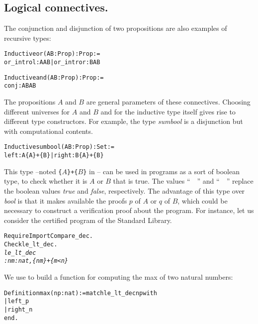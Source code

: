 \documentclass[11pt]{article}
\begin{document}
\subsection{Logical connectives.} \label{LogicalConnectives}
The conjunction and disjunction of two propositions are also examples
of recursive types:

\begin{alltt}
Inductive or (A B : Prop) : Prop :=
    or_introl : A \arrow{} A {\coqor} B | or_intror : B \arrow{} A {\coqor} B

Inductive and (A B : Prop) : Prop :=  
    conj : A \arrow{} B \arrow{} A {\coqand} B

\end{alltt}

The propositions $A$ and $B$ are general parameters of these
connectives. Choosing different universes for 
$A$ and $B$ and for the inductive type itself gives rise to different
type constructors. For example, the type \textsl{sumbool} is a
disjunction but with computational contents.

\begin{alltt}
Inductive sumbool (A B : Prop) : Set :=
    left : A \arrow{} \{A\} + \{B\} | right : B \arrow{} \{A\} + \{B\}
\end{alltt}



This type --noted \texttt{\{$A$\}+\{$B$\}} in {\coq}-- can be used in {\coq}
programs as a sort of boolean type, to check whether it is $A$ or $B$
that is true.  The values ``~~'' and
``~~'' replace the boolean values \textsl{true} and
\textsl{false}, respectively. The advantage of this type over
\textsl{bool} is that it makes available the proofs $p$ of $A$ or $q$
of $B$, which could be necessary to construct a verification proof
about the program.
For instance, let us consider the certified program 
of the Standard Library.

\begin{alltt}
Require Import Compare_dec.
Check le_lt_dec.
\it
le_lt_dec
     : {\prodsym} n m : nat, \{n {\coqle} m\} + \{m < n\}

\end{alltt}

We use  to build a function for computing
the max of two natural numbers:

\begin{alltt}
Definition max (n p :nat) := match le_lt_dec n p with 
                             | left _ {\funarrow} p
                             | right _ {\funarrow} n
                             end.
\end{alltt}
\end{document}
